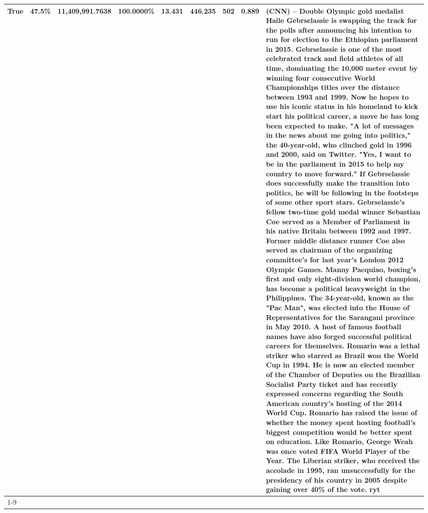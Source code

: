 \begin{table}[H]
{\begin{tabular}{lllrlllll}
True & 47.5\% & 11,409,991.7638 & \bfseries \color{red} 100.0000\% & 13.431 & 446.235 & 502 & 0.889 & (CNN) -- Double Olympic gold medalist Haile Gebrselassie is swapping the track for the polls after announcing his intention to run for election to the Ethiopian parliament in 2015. Gebrselassie is one of the most celebrated track and field athletes of all time, dominating the 10,000 meter event by winning four consecutive World Championships titles over the distance between 1993 and 1999. Now he hopes to use his iconic status in his homeland to kick start his political career, a move he has long been expected to make. "A lot of messages in the news about me going into politics," the 40-year-old, who clinched gold in 1996 and 2000, said on Twitter. "Yes, I want to be in the parliament in 2015 to help my country to move forward." If Gebrselassie does successfully make the transition into politics, he will be following in the footsteps of some other sport stars. Gebrselassie's fellow two-time gold medal winner Sebastian Coe served as a Member of Parliament in his native Britain between 1992 and 1997. Former middle distance runner Coe also served as chairman of the organizing committee's for last year's London 2012 Olympic Games. Manny Pacquiao, boxing's first and only eight-division world champion, has become a political heavyweight in the Philippines. The 34-year-old, known as the "Pac Man", was elected into the House of Representatives for the Sarangani province in May 2010. A host of famous football names have also forged successful political careers for themselves. Romario was a lethal striker who starred as Brazil won the World Cup in 1994. He is now an elected member of the Chamber of Deputies on the Brazilian Socialist Party ticket and has recently expressed concerns regarding the South American country's hosting of the 2014 World Cup. Romario has raised the issue of whether the money spent hosting football's biggest competition would be better spent on education. Like Romario, George Weah was once voted FIFA World Player of the Year. The Liberian striker, who received the accolade in 1995, ran unsuccessfully for the presidency of his country in 2005 despite gaining over 40\% of the vote. ryt \\
\cline{1-9}

\end{tabular}}
\end{table}
